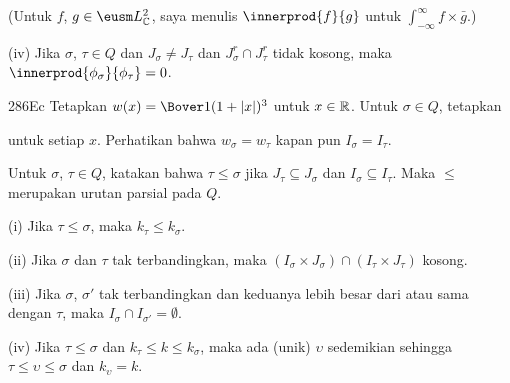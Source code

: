 
\noindent{}(Untuk $f$, $g\in\eusm L_{\Bbb C}^2$, saya menulis
$\innerprod{f}{g}$ untuk $\int_{-\infty}^{\infty}f\times\bar g$.)

\quad(iv) Jika $\sigma$, $\tau\in Q$ dan $J_{\sigma}\ne J_{\tau}$ dan
$J^r_{\sigma}\cap J^r_{\tau}$ tidak kosong, maka  $\innerprod{\phi_{\sigma}}{\phi_{\tau}}=0$.

\spheader 286Ec Tetapkan $w(x)=\Bover1{(1+|x|)^3}$ untuk $x\in\Bbb R$.
Untuk $\sigma\in Q$, tetapkan


\noindent untuk setiap $x$. Perhatikan bahwa $w_{\sigma}=w_{\tau}$ kapan pun
$I_{\sigma}=I_{\tau}$.

 Untuk $\sigma$, $\tau\in Q$, katakan bahwa
$\tau\le\sigma$ jika $J_{\tau}\subseteq J_{\sigma}$ dan
$I_{\sigma}\subseteq I_{\tau}$. Maka $\le$ merupakan urutan parsial pada
$Q$. 

\quad(i) Jika $\tau\le\sigma$, maka $k_{\tau}\le k_{\sigma}$.

\quad(ii) Jika $\sigma$ dan $\tau$ tak terbandingkan, maka $(I_{\sigma}\times
J_{\sigma})\cap(I_{\tau}\times J_{\tau})$ kosong. 

\quad(iii) Jika $\sigma$, $\sigma'$ tak terbandingkan dan keduanya
lebih besar dari atau sama dengan $\tau$, maka $I_{\sigma}\cap
I_{\sigma'}=\emptyset$.

\quad(iv) Jika $\tau\le\sigma$ dan $k_{\tau}\le k\le k_{\sigma}$, maka ada
(unik) $\upsilon$ sedemikian sehingga $\tau\le\upsilon\le\sigma$ dan
$k_{\upsilon}=k$. 


